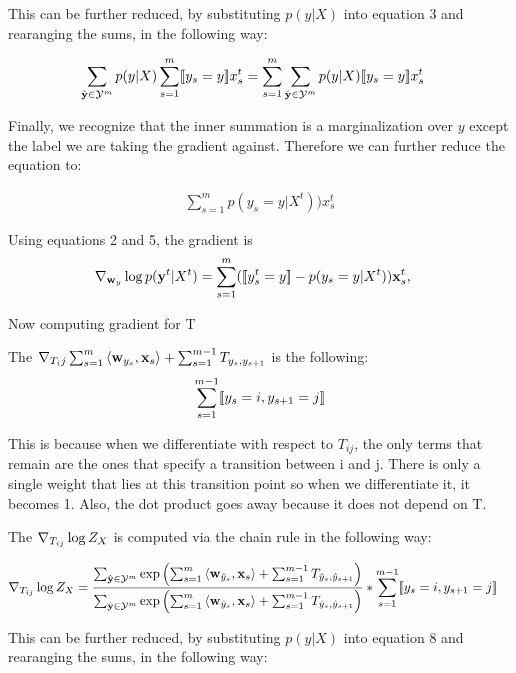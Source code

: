 \documentclass[11pt]{report}
\begin{document}
	This can be further reduced, by substituting $p(y|X)$ into equation 3 and rearanging the sums, in the following way:

	\begin{align}
	\sum_{\hat{\mathbf{\boldsymbol{y}}} \in \mathcal{Y}^m} p(y|X) \sum_{s=1}^m [\![y_s = y]\!]x_s^t &= \sum_{s=1}^m  \sum_{\hat{\mathbf{\boldsymbol{y}}} \in \mathcal{Y}^m}   p(y|X)[\![y_s = y]\!]x_s^t
	\end{align}

	Finally, we recognize that the inner summation is a marginalization over $y$ except the label we are taking the gradient against. Therefore we can further reduce the equation to:

	\begin{align}
	 \sum_{s=1}^m {p(y_s=y | X^t))}x_s^t
	\end{align}

	Using equations 2 and 5, the gradient is 
	\begin{align}
		{\nabla}_{\mathbf{\boldsymbol{w}}_y} \log p(\mathbf{\boldsymbol{y}}^t|X^t) &= \sum_{s=1}^m ([\![y^t_s = y]\!] - p(y_s = y | X^t)) \mathbf{\boldsymbol{x}}^t_s,
	\end{align}
	


	Now computing gradient for T


	The ${\nabla}_{T_ij} \sum_{s=1}^m \left\langle \mathbf{\boldsymbol{w}}_{y_s},\mathbf{\boldsymbol{x}}_s \right\rangle + \sum_{s=1}^{m-1} T_{y_s, y_{s+1}}$ is the following:
	\begin{align}
	\sum_{s=1}^{m-1} [\![y_s = i, y_{s+1} = j]\!]
	\end{align}

	This is because when we differentiate with respect to $T_{ij}$, the only terms that remain are the ones that specify a transition between i and j. There is only a single weight that lies at this transition point so when we differentiate it, it becomes 1. Also, the dot product goes away because it does not depend on T.

	The ${\nabla}_{T_{ij}} \log Z_X$ is computed via the chain rule in the following way:

	\begin{align}
	{\nabla}_{T_{ij}} \log Z_X &= \frac{ \sum_{\hat{\mathbf{\boldsymbol{y}}} \in \mathcal{Y}^m} \exp \left(\sum_{s=1}^m \left\langle \mathbf{\boldsymbol{w}}_{\hat{y}_s},\mathbf{\boldsymbol{x}}_s \right\rangle + \sum_{s=1}^{m-1} T_{\hat{y}_s, \hat{y}_{s+1}}\right) }
	{\sum_{\hat{\mathbf{\boldsymbol{y}}} \in \mathcal{Y}^m} \exp \left(\sum_{s=1}^m \left\langle \mathbf{\boldsymbol{w}}_{\hat{y}_s},\mathbf{\boldsymbol{x}}_s \right\rangle + \sum_{s=1}^{m-1} T_{\hat{y}_s, \hat{y}_{s+1}}\right)} * \sum_{s=1}^{m-1} [\![y_s = i, y_{s+1} = j]\!]
	\end{align}


	This can be further reduced, by substituting $p(y|X)$ into equation 8 and rearanging the sums, in the following way:
\end{document}
